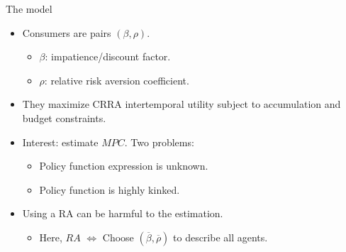 \documentclass[10pt, handout]{beamer}
\begin{document}
\begin{frame}
	\tableofcontents[currentsection]
\end{frame}

\begin{frame}[label=Carroll-Model]{The model}
	\vfill
	\begin{itemize}
		\item Consumers are pairs $(\beta, \rho)$.\vspace{1ex}
			\begin{itemize}
				\item $\beta$: impatience/discount factor. \vspace{1ex}
				\item $\rho$: relative risk aversion coefficient. 
			\end{itemize} \vfill
		
		 \item They maximize CRRA intertemporal utility subject to accumulation and budget constraints. \hyperlink{Carroll-Program}{} \vfill
			
		\item Interest: estimate $MPC$. Two problems: \vspace{1ex}
			\begin{itemize}
				\item Policy function expression is unknown. \vspace{1ex}
				\item Policy function is highly kinked. \hyperlink{Carroll-Consumption}{}
			\end{itemize} \vfill
		
		\item Using a RA can be harmful to the estimation. \vspace{1ex}
			\begin{itemize}
				\item Here, $RA$ $\Leftrightarrow$ Choose $\left(\overline{\beta}, \overline{\rho}\right)$ to describe all agents.
			\end{itemize} \vfill

	\end{itemize}
\end{frame}
\end{document}
